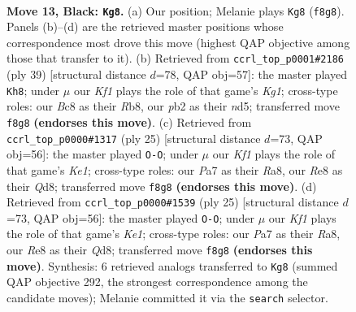 \documentclass[11pt]{article}
\begin{document}
\clearpage

\begin{figure}[p]\centering
\begin{subfigure}{0.46\textwidth}\centering
\resizebox{\linewidth}{!}{%
\newchessgame
\chessboard[
  setfen={1rbqrk2/p2pppbp/2p3p1/8/2P1BP1P/2N3P1/PP6/R1BQ1RK1 b - - 0 13},
  showmover=false,
  pgfstyle=straightmove, color=movearrow, markmove={f8-g8}
]}
\caption{}
\end{subfigure}\hfill
\begin{subfigure}{0.46\textwidth}\centering
\resizebox{\linewidth}{!}{%
\newchessgame
\chessboard[
  setfen={1r3rk1/3q2p1/p2p3p/1p1Npb2/7b/Q3B2P/PPPR1PP1/R5K1 b - - 5 20},
  showmover=false,
  pgfstyle=straightmove, color=movearrow, markmove={g8-h8}
]}
\caption{}
\end{subfigure}
\\[4pt]
\begin{subfigure}{0.46\textwidth}\centering
\resizebox{\linewidth}{!}{%
\newchessgame
\chessboard[
  setfen={r2qk2r/p2bppbp/2p3p1/2P5/4B3/6P1/PP3P1P/R1BQ1RK1 b kq - 0 13},
  showmover=false,
  pgfstyle=straightmove, color=movearrow, markmove={e8-g8}
]}
\caption{}
\end{subfigure}\hfill
\begin{subfigure}{0.46\textwidth}\centering
\resizebox{\linewidth}{!}{%
\newchessgame
\chessboard[
  setfen={r2qk2r/p2bppbp/2p3p1/2P5/4B3/6P1/PP3P1P/R1BQ1RK1 b kq - 0 13},
  showmover=false,
  pgfstyle=straightmove, color=movearrow, markmove={e8-g8}
]}
\caption{}
\end{subfigure}
\caption{\textbf{Move 13, Black: \texttt{Kg8}.} (a) Our position; Melanie plays \texttt{Kg8} (\texttt{f8g8}). Panels (b)--(d) are the retrieved master positions whose correspondence most drove this move (highest QAP objective among those that transfer to it). (b) Retrieved from \texttt{ccrl\_top\_p0001\#2186} (ply 39) [structural distance $d$=78, QAP obj=57]: the master played \texttt{Kh8}; under $\mu$ our \emph{Kf1} plays the role of that game's \emph{Kg1}; cross-type roles: our \emph{B}c8 as their \emph{R}b8, our \emph{p}b2 as their \emph{n}d5; transferred move \texttt{f8g8} \textbf{(endorses this move)}. (c) Retrieved from \texttt{ccrl\_top\_p0000\#1317} (ply 25) [structural distance $d$=73, QAP obj=56]: the master played \texttt{O-O}; under $\mu$ our \emph{Kf1} plays the role of that game's \emph{Ke1}; cross-type roles: our \emph{P}a7 as their \emph{R}a8, our \emph{R}e8 as their \emph{Q}d8; transferred move \texttt{f8g8} \textbf{(endorses this move)}. (d) Retrieved from \texttt{ccrl\_top\_p0000\#1539} (ply 25) [structural distance $d$=73, QAP obj=56]: the master played \texttt{O-O}; under $\mu$ our \emph{Kf1} plays the role of that game's \emph{Ke1}; cross-type roles: our \emph{P}a7 as their \emph{R}a8, our \emph{R}e8 as their \emph{Q}d8; transferred move \texttt{f8g8} \textbf{(endorses this move)}. Synthesis: 6 retrieved analogs transferred to \texttt{Kg8} (summed QAP objective 292, the strongest correspondence among the candidate moves); Melanie committed it via the \texttt{search} selector.}
\label{fig:thought-m25}
\end{figure}
\end{document}
